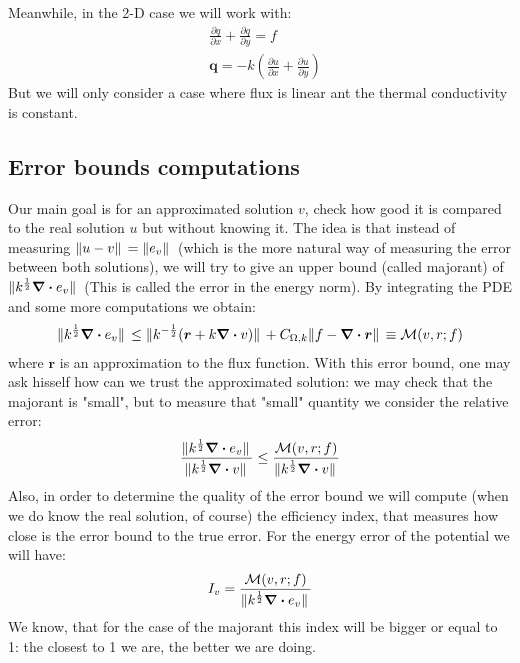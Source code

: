 \documentclass{article}
\begin{document}
    Meanwhile, in the 2-D case we will work with:
    \begin{align*}
        &\frac{\partial q}{\partial x} + \frac{\partial q}{\partial y}  = f \\
        &\bm{q} = -k \left( \frac{\partial u}{\partial x} + \frac{\partial u}{\partial y}\right)
    \end{align*}
    But we will only consider a case where flux is linear ant the thermal conductivity is constant.
    
    \subsection*{Error bounds computations}
    Our main goal is for an approximated solution $v$, check how good it is compared to the real solution $u$ but without knowing it. The idea is that instead of measuring $\norm*{u-v} = \norm*{e_v}$ (which is the more natural way of measuring the error between both solutions), we will try to give an upper bound (called majorant) of $\norm*{k^{\frac{1}{2}}\div e_v}$ (This is called the error in the energy norm). By integrating the PDE and some more computations we obtain:
    \begin{align*}
        \norm*{k^{\frac{1}{2}}\div e_v} \leq \norm*{k^{-\frac{1}{2}}(\bm{r}+k\div v)} + C_{\Omega,k}\norm*{f-\div \bm{r}} \equiv \mathcal{M}(v,r;f)
    \end{align*}
    where $\bm{r}$ is an approximation to the flux function.
    With this error bound, one may ask hisself how can we trust the approximated solution: we may check that the majorant is "small", but to measure that "small" quantity we consider the relative error:
    \begin{align*}
        \frac{\norm*{k^{\frac{1}{2}}\div e_v}}{\norm*{k^{\frac{1}{2}}\div v}} \leq \frac{\mathcal{M}(v,r;f)}{\norm*{k^{\frac{1}{2}}\div v}}
    \end{align*}
    Also, in order to determine the quality of the error bound we will compute (when we do know the real solution, of course) the efficiency index, that measures how close is the error bound to the true error. For the energy error of the potential we will have:
    \begin{align*}
        I_v = \frac{\mathcal{M}(v,r;f)}{\norm*{k^{\frac{1}{2}}\div e_v}}
    \end{align*}
    We know, that for the case of the majorant this index will be bigger or equal to 1: the closest to 1 we are, the better we are doing.\\
\end{document}
